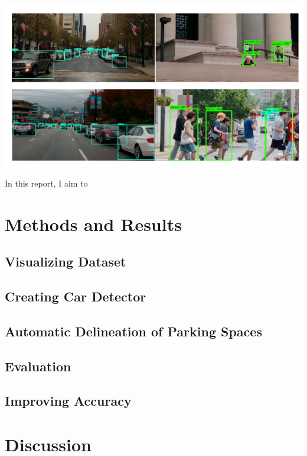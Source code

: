 \documentclass[man]{apa7}
\begin{document}
\begin{minipage}{\linewidth}
  \includegraphics[height=\textheight/4 ,width=\textwidth/2]{figures/detectionExample.png}
  \label{fig:exampleDetection}
\end{minipage}

In this report, I aim to 


\section{Methods and Results}

\subsection{Visualizing Dataset}

\subsection{Creating Car Detector}

\subsection{Automatic Delineation of Parking Spaces}

\subsection{Evaluation}

\subsection{Improving Accuracy}

\section{Discussion}
\end{document}
